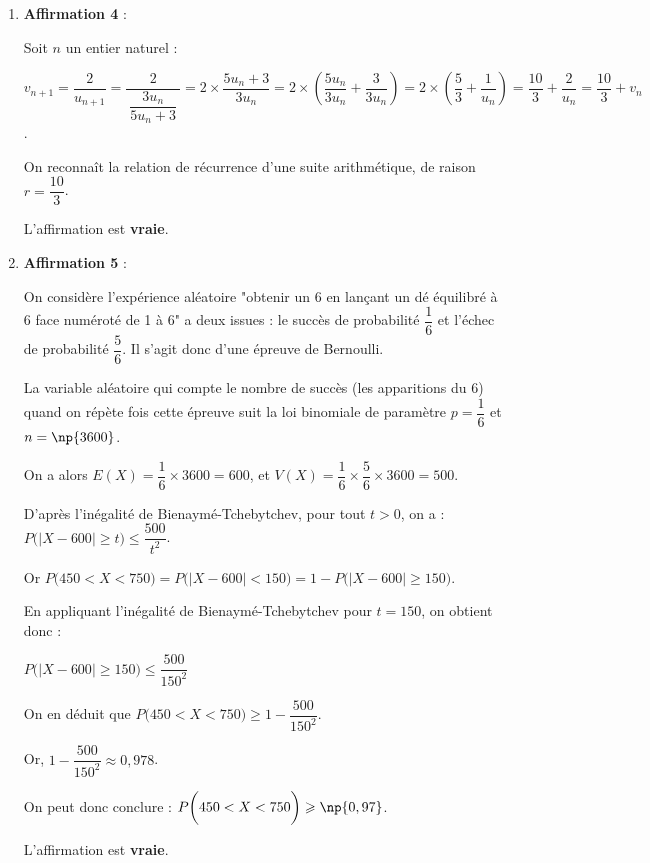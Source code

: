 \begin{enumerate}
		Le discriminant est :\quad $\Delta = b^2-4ac = 121$,\quad donc la fonction du second degré \quad $x \longmapsto x^2-5x-24$ \quad admet deux racines :\quad $-3$ et 8.

		Le coefficient du terme de degré 2 est $a=1$, donc cette fonction est positive sur $]-\infty  ; -3] \cup [8 ;+\infty[$.

		Sur $]7  ; + \infty[$, l'inéquation a pour ensemble de solutions l'intervalle $[8 ; +\infty[$.

		L'affirmation est \textbf{vraie}.

		\item \textbf{Affirmation 4} :

		Soit $n$ un entier naturel :

		$v_{n+1} = \dfrac{2}{u_{n+1}} = \dfrac{2}{~\dfrac{3u_n}{5u_n+3}~} = 2\times \dfrac{5u_n + 3}{3u_n} = 2\times \left(\dfrac{5u_n}{3u_n} + \dfrac{3}{3u_n}\right) = 2\times \left(\dfrac{5}{3} + \dfrac{1}{u_n}\right) = \dfrac{10}{3} + \dfrac{2}{u_n} = \dfrac{10}{3} + v_n$.

		On reconnaît la relation de récurrence d'une suite arithmétique, de raison $r = \dfrac{10}{3}$.

		L'affirmation est \textbf{vraie}.

		\item \textbf{Affirmation 5} :

		On considère l'expérience aléatoire "obtenir un 6 en lançant un dé équilibré à 6 face numéroté de 1 à 6" a deux issues : le succès de probabilité $\dfrac16$ et l'échec de probabilité $\dfrac56$. Il s'agit donc d'une épreuve de Bernoulli.

		La variable aléatoire qui compte le nombre de succès (les apparitions du 6) quand on répète  fois cette épreuve suit la loi binomiale de paramètre $p=\dfrac16$ et $n=\np{3600}$.

		On a alors \quad $E(X)=\dfrac16 \times 3600 = 600$, \quad et \quad $V(X)=\dfrac16 \times \dfrac56 \times 3600=500$.

		D'après l'inégalité de Bienaymé-Tchebytchev, pour tout $t >0$, on a :\quad $P \bigg( \big\vert X-600 \big\vert \geqslant t \bigg) \leqslant \dfrac{500}{t^2}$.

		Or \quad $P \bigg( 450 < X < 750 \bigg) = P \bigg( \big\vert X-600 \big\vert < 150 \bigg) =1- P \bigg( \big\vert X-600 \big\vert \geqslant 150 \bigg)$.

		En appliquant l'inégalité de Bienaymé-Tchebytchev pour $t=150$, on obtient donc :

		$P \bigg( \big\vert X-600 \big\vert \geqslant 150 \bigg) \leqslant \dfrac{500}{150^2}$

		On en déduit que \quad $P \bigg( 450 < X < 750 \bigg)  \geqslant 1-\dfrac{500}{150^2}$.

		Or, \quad $1-\dfrac{500}{150^2} \approx 0,978$.

		On peut donc conclure : \quad $P \bigg( 450 < X < 750 \bigg) \geqslant \np{0,97}$.

		L'affirmation est \textbf{vraie}.
	\end{enumerate}
